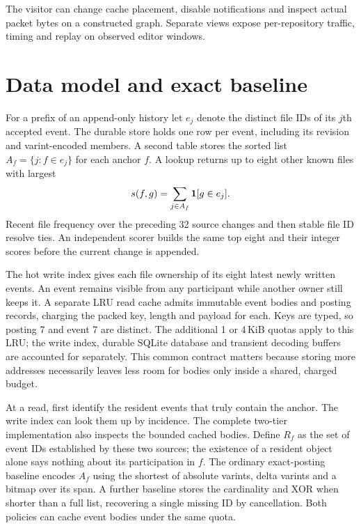 \documentclass[conference]{IEEEtran}
\begin{document}
The visitor can change cache placement, disable notifications and inspect actual packet bytes on a constructed graph. Separate views expose per-repository traffic, timing and replay on observed editor windows.

\section{Data model and exact baseline}
For a prefix of an append-only history let $e_j$ denote the distinct file IDs of its $j$th accepted event. The durable store holds one row per event, including its revision and varint-encoded members. A second table stores the sorted list $A_f=\{j:f\in e_j\}$ for each anchor $f$. A lookup returns up to eight other known files with largest
\begin{equation}
s(f,g)=\sum_{j\in A_f}{\bf 1}[g\in e_j].
\end{equation}
Recent file frequency over the preceding 32 source changes and then stable file ID resolve ties. An independent scorer builds the same top eight and their integer scores before the current change is appended. 

The hot write index gives each file ownership of its eight latest newly written events. An event remains visible from any participant while another owner still keeps it. A separate LRU read cache admits immutable event bodies and posting records, charging the packed key, length and payload for each. Keys are typed, so posting 7 and event 7 are distinct. The additional 1 or 4\,KiB quotas apply to this LRU; the write index, durable SQLite database and transient decoding buffers are accounted for separately. This common contract matters because storing more addresses necessarily leaves less room for bodies only inside a shared, charged budget.

At a read, first identify the resident events that truly contain the anchor. The write index can look them up by incidence. The complete two-tier implementation also inspects the bounded cached bodies. Define $R_f$ as the set of event IDs established by these two sources; the existence of a resident object alone says nothing about its participation in $f$. The ordinary exact-posting baseline encodes $A_f$ using the shortest of absolute varints, delta varints and a bitmap over its span. A further baseline stores the cardinality and XOR when shorter than a full list, recovering a single missing ID by cancellation. Both policies can cache event bodies under the same quota.
\end{document}
